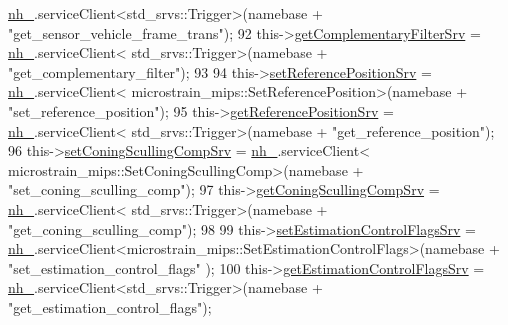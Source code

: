 \begin{DoxyCode}
      \hyperlink{classcl__microstrain__mips_1_1ClMicrostainMips_a5a39ba0864ba2c4c003b6ea427538243}{nh\_}.serviceClient<std\_srvs::Trigger>(namebase + \textcolor{stringliteral}{"get\_sensor\_vehicle\_frame\_trans"});
92                 this->\hyperlink{classcl__microstrain__mips_1_1ClMicrostainMips_a39aa3d9d1bbe86d90548f7422aa0b4a4}{getComplementaryFilterSrv} = \hyperlink{classcl__microstrain__mips_1_1ClMicrostainMips_a5a39ba0864ba2c4c003b6ea427538243}{nh\_}.serviceClient<
      std\_srvs::Trigger>(namebase + \textcolor{stringliteral}{"get\_complementary\_filter"});
93 
94                 this->\hyperlink{classcl__microstrain__mips_1_1ClMicrostainMips_a778117029f93a6cff9c5e2a0dac9742b}{setReferencePositionSrv} = \hyperlink{classcl__microstrain__mips_1_1ClMicrostainMips_a5a39ba0864ba2c4c003b6ea427538243}{nh\_}.serviceClient<
      microstrain\_mips::SetReferencePosition>(namebase + \textcolor{stringliteral}{"set\_reference\_position"});
95                 this->\hyperlink{classcl__microstrain__mips_1_1ClMicrostainMips_a1f9b56f826c67a2e1d8a33e0879053bc}{getReferencePositionSrv} = \hyperlink{classcl__microstrain__mips_1_1ClMicrostainMips_a5a39ba0864ba2c4c003b6ea427538243}{nh\_}.serviceClient<
      std\_srvs::Trigger>(namebase + \textcolor{stringliteral}{"get\_reference\_position"});
96                 this->\hyperlink{classcl__microstrain__mips_1_1ClMicrostainMips_ae24545c615e2be170adced3999d94d84}{setConingScullingCompSrv} = \hyperlink{classcl__microstrain__mips_1_1ClMicrostainMips_a5a39ba0864ba2c4c003b6ea427538243}{nh\_}.serviceClient<
      microstrain\_mips::SetConingScullingComp>(namebase + \textcolor{stringliteral}{"set\_coning\_sculling\_comp"});
97                 this->\hyperlink{classcl__microstrain__mips_1_1ClMicrostainMips_a877393b5cf4c313e0e433e9c92163265}{getConingScullingCompSrv} = \hyperlink{classcl__microstrain__mips_1_1ClMicrostainMips_a5a39ba0864ba2c4c003b6ea427538243}{nh\_}.serviceClient<
      std\_srvs::Trigger>(namebase + \textcolor{stringliteral}{"get\_coning\_sculling\_comp"});
98 
99                 this->\hyperlink{classcl__microstrain__mips_1_1ClMicrostainMips_a2eeff01aea4a41fd5d24ff2f77daf584}{setEstimationControlFlagsSrv} = 
      \hyperlink{classcl__microstrain__mips_1_1ClMicrostainMips_a5a39ba0864ba2c4c003b6ea427538243}{nh\_}.serviceClient<microstrain\_mips::SetEstimationControlFlags>(namebase + \textcolor{stringliteral}{"set\_estimation\_control\_flags"}
      );
100                 this->\hyperlink{classcl__microstrain__mips_1_1ClMicrostainMips_a64039ee26cf8a290b3c22b787b8868a5}{getEstimationControlFlagsSrv} = 
      \hyperlink{classcl__microstrain__mips_1_1ClMicrostainMips_a5a39ba0864ba2c4c003b6ea427538243}{nh\_}.serviceClient<std\_srvs::Trigger>(namebase + \textcolor{stringliteral}{"get\_estimation\_control\_flags"});

\end{DoxyCode}
